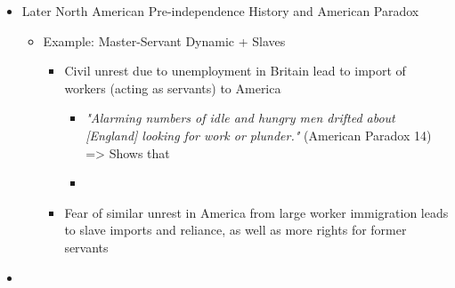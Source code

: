 \documentclass[letterpaper]{article}
\begin{document}
\begin{itemize}
\item Later North American Pre-independence History and American Paradox

\begin{itemize}
\item Example: Master-Servant Dynamic + Slaves

\begin{itemize}
\item Civil unrest due to unemployment in Britain lead to import of
workers (acting as servants) to America

\begin{itemize}
\item \emph{"Alarming numbers of idle and hungry men drifted about
[England] looking for work or plunder."} (American Paradox 14)
=> Shows that
\item 
\end{itemize}

\item Fear of similar unrest in America from large worker immigration
leads to slave imports and reliance, as well as more rights for
former servants
\end{itemize}
\end{itemize}

\item 
\end{itemize}
\end{document}

